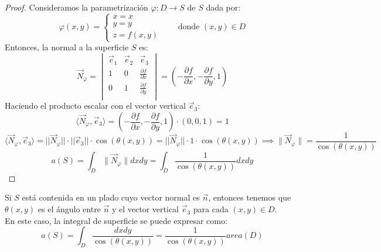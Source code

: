\begin{proof}
    Consideramos la parametrización $\varphi : D \to S$ de $S$ dada por:
    $$ \varphi(x,y) = \begin{cases}
        x = x \\
        y = y \\
        z = f(x,y)  
    \end{cases} \qquad \text{donde } (x,y) \in D$$
    Entonces, la normal a la superficie $S$ es:
    $$ \vec{N}_\varphi = \begin{vmatrix}
        \vec{e}_1 & \vec{e}_2 & \vec{e}_3 \\
        1         & 0         & \frac{\partial f}{\partial x} \\
        0         & 1         & \frac{\partial f}{\partial y} \\
    \end{vmatrix} = \left( -\frac{\partial f}{\partial x}, -\frac{\partial f}{\partial y}, 1 \right)$$
    Haciendo el producto escalar con el vector vertical $\vec{e}_3$:
    $$ \langle \vec{N}_\varphi, \vec{e}_3 \rangle = \left( -\frac{\partial f}{\partial x}, -\frac{\partial f}{\partial y}, 1 \right) \cdot (0,0,1) = 1$$
    $$ \langle \vec{N}_\varphi, \vec{e}_3 \rangle = ||\vec{N}_\varphi|| \cdot ||\vec{e}_3|| \cdot \cos(\theta(x,y)) = ||\vec{N}_\varphi|| \cdot 1 \cdot \cos(\theta(x,y)) \implies \lVert \vec{N}_\varphi \rVert = \frac{1}{\cos(\theta(x,y))}$$
    $$a(S) = \int_{D} \lVert \vec{N}_\varphi \rVert dxdy = \int_{D} \frac{1}{\cos(\theta(x,y))} dxdy$$
\end{proof}

\begin{observación}
    Si $S$ está contenida en un plado cuyo vector normal es $\vec{n}$, entonces tenemos que $\theta(x,y)$ es el ángulo entre $\vec{n}$ y el vector vertical $\vec{e}_3$ para cada $(x,y) \in D$.\\
    En este caso, la integral de superficie se puede expresar como:
    $$ a(S) = \int_{D} \frac{dxdy}{\cos(\theta(x,y))} = \frac{1}{\cos(\theta(x,y))} area(D)$$
\end{observación}

